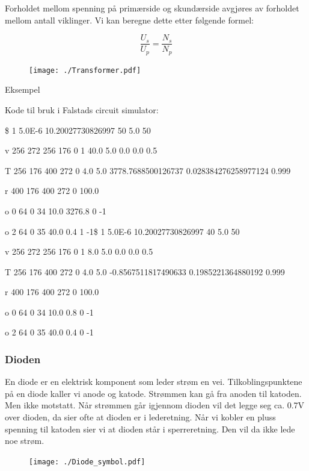 \documentclass[12pt,a4paper]{article}
\begin{document}
Forholdet mellom spenning på primærside og skundærside avgjøres av
forholdet mellom antall viklinger. Vi kan beregne dette etter følgende
formel:

\[
\frac{U_{s}}{U_{p}}=\frac{N_{s}}{N_{p}}
\]

\begin{figure}[H]
\noindent \begin{centering}
\texttt{[image: ./Transformer.pdf]}
\par\end{centering}
\caption{}
\end{figure}

Eksempel

Kode til bruk i Falstads circuit simulator:

\$ 1 5.0E-6 10.20027730826997 50 5.0 50

v 256 272 256 176 0 1 40.0 5.0 0.0 0.0 0.5

T 256 176 400 272 0 4.0 5.0 3778.7688500126737 0.028384276258977124
0.999

r 400 176 400 272 0 100.0

o 0 64 0 34 10.0 3276.8 0 -1

o 2 64 0 35 40.0 0.4 1 -1\$ 1 5.0E-6 10.20027730826997 40 5.0 50

v 256 272 256 176 0 1 8.0 5.0 0.0 0.0 0.5

T 256 176 400 272 0 4.0 5.0 -0.8567511817490633 0.1985221364880192
0.999

r 400 176 400 272 0 100.0

o 0 64 0 34 10.0 0.8 0 -1

o 2 64 0 35 40.0 0.4 0 -1

\subsubsection{Dioden}

En diode er en elektrisk komponent som leder strøm en vei. Tilkoblingspunktene
på en diode kaller vi anode og katode. Strømmen kan gå fra anoden
til katoden. Men ikke motstatt. Når strømmen går igjennom dioden vil
det legge seg ca. 0.7V over dioden, da sier ofte at dioden er i lederetning.
Når vi kobler en pluss spenning til katoden sier vi at dioden står
i sperreretning. Den vil da ikke lede noe strøm. 

\begin{figure}[H]
\noindent \begin{centering}
\texttt{[image: ./Diode\_symbol.pdf]}
\par\end{centering}
\caption{}
\end{figure}
\end{document}
